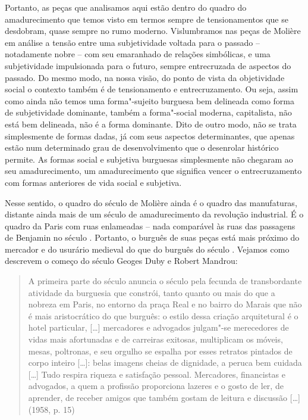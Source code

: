 Portanto, as peças que analisamos aqui estão dentro do quadro do
amadurecimento que temos visto em termos sempre de tensionamentos que se
desdobram, quase sempre no rumo moderno. Vislumbramos nas peças de
Molière em análise a tensão entre uma subjetividade voltada para o
passado -- notadamente nobre -- com seu emaranhado de relações
simbólicas, e uma subjetividade impulsionada para o futuro, sempre
entrecruzada de aspectos do passado. Do mesmo modo, na nossa visão, do
ponto de vista da objetividade social o contexto também é de
tensionamento e entrecruzamento. Ou seja, assim como ainda não temos uma
forma"-sujeito burguesa bem delineada como forma de subjetividade
dominante, também a forma"-social moderna, capitalista, não está bem
delineada, não é a forma dominante. Dito de outro modo, não se trata
simplesmente de formas dadas, já com seus aspectos determinantes, que
apenas estão num determinado grau de desenvolvimento que o desenrolar
histórico permite. As formas social e subjetiva burguesas simplesmente
não chegaram ao seu amadurecimento, um amadurecimento que significa
vencer o entrecruzamento com formas anteriores de vida social e
subjetiva.

Nesse sentido, o quadro do século  de Molière ainda é o quadro das
manufaturas, distante ainda mais de um século de amadurecimento da
revolução industrial. É o quadro da Paris com ruas enlameadas -- nada
comparável às ruas das passagens de Benjamin no século . Portanto, o
burguês de suas peças está mais próximo do mercador e do usurário
medieval do que do burguês do século . Vejamos como descrevem o
começo do século  Geoges Duby e Robert Mandrou:

\begin{quote}
A primeira parte do século  anuncia o século  pela fecunda de
transbordante atividade da burguesia que constrói, tanto quanto ou mais
do que a nobreza em Paris, no entorno da praça Real e no bairro do
Marais que não é mais aristocrático do que burguês: o estilo dessa
criação arquitetural é o hotel particular, [\ldots{}] mercadores e
advogados julgam"-se merecedores de vidas mais afortunadas e de carreiras
exitosas, multiplicam os móveis, mesas, poltronas, e seu orgulho se
espalha por esses retratos pintados de corpo inteiro [\ldots{}]:
belas imagens cheias de dignidade, a peruca bem cuidada [\ldots{}]
Tudo respira riqueza e satisfação pessoal. Mercadores, financistas e
advogados, a quem a profissão proporciona lazeres e o gosto de ler, de
aprender, de receber amigos que também gostam de leitura e discussão
[\ldots{}] (1958, p. 15)
\end{quote}

